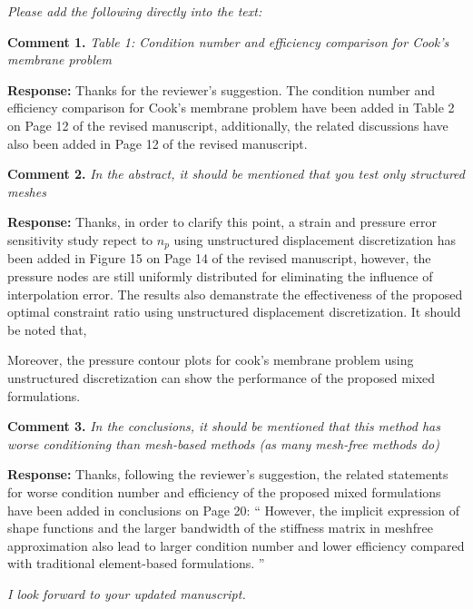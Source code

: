 \documentclass{article}
\begin{document}
\textit{Please add the following directly into the text:}

\textbf{Comment 1.} \textit{ Table 1: Condition number and eﬀiciency comparison for Cook's membrane problem}

\textbf{Response:}
Thanks for the reviewer's suggestion. The condition number and efficiency comparison for Cook's membrane problem have been added in Table 2 on Page 12 of the revised manuscript, 
additionally, the related discussions have also been added in Page 12 of the revised manuscript.

\textbf{Comment 2.} \textit{ In the abstract, it should be mentioned that you test only structured meshes}

\textbf{Response:} 
Thanks, in order to clarify this point, 
a strain and pressure error sensitivity study repect to $n_p$ using unstructured displacement discretization has been added in Figure 15 on Page 14 of the revised manuscript,
however, the pressure nodes are still uniformly distributed for eliminating the influence of interpolation error.
The results also demanstrate the effectiveness of the proposed optimal constraint ratio using unstructured displacement discretization.
It should be noted that, 

Moreover, 
the pressure contour plots for cook's membrane problem using unstructured discretization can show the performance of the proposed mixed formulations.

\textbf{Comment 3.} \textit{In the conclusions, it should be mentioned that this method has worse conditioning than mesh-based methods (as many mesh-free methods do)}

\textbf{Response:}
Thanks, following the reviewer's suggestion,
the related statements for worse condition number and efficiency of the proposed mixed formulations have been added in conclusions on Page 20:
``
However, the implicit expression of shape functions and the larger bandwidth of the stiffness matrix in meshfree approximation also lead to larger condition number and lower efficiency compared with traditional element-based formulations.
'' 

\textit{I look forward to your updated manuscript.}


% 
\end{document}
